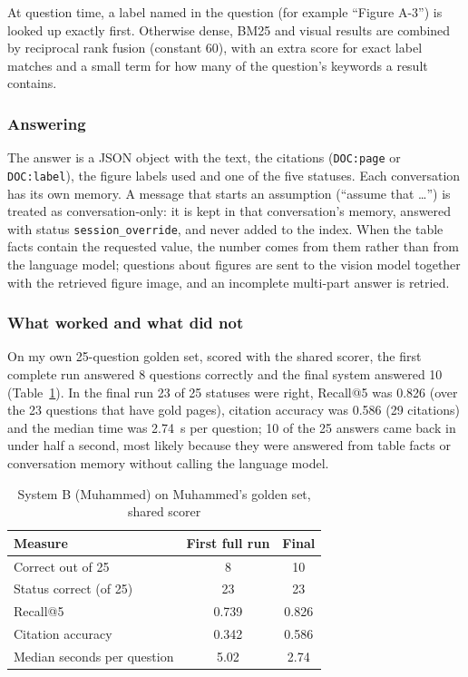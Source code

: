At question time, a label named in the question (for example ``Figure A-3'') is looked up exactly first. Otherwise dense, BM25 and visual results are combined by reciprocal rank fusion (constant 60), with an extra score for exact label matches and a small term for how many of the question's keywords a result contains.

\subsubsection{Answering}
The answer is a JSON object with the text, the citations (\texttt{DOC:page} or \texttt{DOC:label}), the figure labels used and one of the five statuses. Each conversation has its own memory. A message that starts an assumption (``assume that \dots'') is treated as conversation-only: it is kept in that conversation's memory, answered with status \texttt{session\_override}, and never added to the index. When the table facts contain the requested value, the number comes from them rather than from the language model; questions about figures are sent to the vision model together with the retrieved figure image, and an incomplete multi-part answer is retried.

\subsubsection{What worked and what did not}
On my own 25-question golden set, scored with the shared scorer, the first complete run answered 8 questions correctly and the final system answered 10 (Table~\ref{tab:p1b}). In the final run 23 of 25 statuses were right, Recall@5 was 0.826 (over the 23 questions that have gold pages), citation accuracy was 0.586 (29 citations) and the median time was 2.74~s per question; 10 of the 25 answers came back in under half a second, most likely because they were answered from table facts or conversation memory without calling the language model.
\begin{table}[!t]
\centering
\caption{System B (Muhammed) on Muhammed's golden set, shared scorer}
\label{tab:p1b}
\begin{tabular}{lcc}
\hline
Measure & First full run & Final \\
\hline
Correct out of 25 & 8 & 10 \\
Status correct (of 25) & 23 & 23 \\
Recall@5 & 0.739 & 0.826 \\
Citation accuracy & 0.342 & 0.586 \\
Median seconds per question & 5.02 & 2.74 \\
\hline
\end{tabular}
\end{table}

